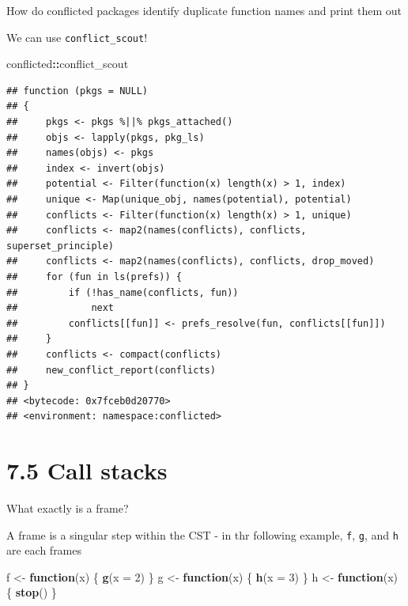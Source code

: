 \documentclass[]{book}
\newenvironment{Shaded}{\begin{snugshade}}{\end{snugshade}}
\newcommand{\ControlFlowTok}[1]{\textcolor[rgb]{0.13,0.29,0.53}{\textbf{#1}}}
\newcommand{\DataTypeTok}[1]{\textcolor[rgb]{0.13,0.29,0.53}{#1}}
\newcommand{\DecValTok}[1]{\textcolor[rgb]{0.00,0.00,0.81}{#1}}
\newcommand{\KeywordTok}[1]{\textcolor[rgb]{0.13,0.29,0.53}{\textbf{#1}}}
\newcommand{\NormalTok}[1]{#1}
\newcommand{\OperatorTok}[1]{\textcolor[rgb]{0.81,0.36,0.00}{\textbf{#1}}}
\newcommand{\StringTok}[1]{\textcolor[rgb]{0.31,0.60,0.02}{#1}}
\begin{document}
How do conflicted packages identify duplicate function names and print them out

We can use \texttt{conflict\_scout}!

\begin{Shaded}
\begin{Highlighting}[]
\NormalTok{conflicted}\OperatorTok{::}\NormalTok{conflict_scout}
\end{Highlighting}
\end{Shaded}

\begin{verbatim}
## function (pkgs = NULL) 
## {
##     pkgs <- pkgs %||% pkgs_attached()
##     objs <- lapply(pkgs, pkg_ls)
##     names(objs) <- pkgs
##     index <- invert(objs)
##     potential <- Filter(function(x) length(x) > 1, index)
##     unique <- Map(unique_obj, names(potential), potential)
##     conflicts <- Filter(function(x) length(x) > 1, unique)
##     conflicts <- map2(names(conflicts), conflicts, superset_principle)
##     conflicts <- map2(names(conflicts), conflicts, drop_moved)
##     for (fun in ls(prefs)) {
##         if (!has_name(conflicts, fun)) 
##             next
##         conflicts[[fun]] <- prefs_resolve(fun, conflicts[[fun]])
##     }
##     conflicts <- compact(conflicts)
##     new_conflict_report(conflicts)
## }
## <bytecode: 0x7fceb0d20770>
## <environment: namespace:conflicted>
\end{verbatim}

\hypertarget{call-stacks}{%
\section*{7.5 Call stacks}\label{call-stacks}}

What exactly is a frame?

A frame is a singular step within the CST - in thr following example, \texttt{f}, \texttt{g}, and \texttt{h} are each frames

\begin{Shaded}
\begin{Highlighting}[]
\NormalTok{f <-}\StringTok{ }\ControlFlowTok{function}\NormalTok{(x) \{}
  \KeywordTok{g}\NormalTok{(}\DataTypeTok{x =} \DecValTok{2}\NormalTok{)}
\NormalTok{\}}
\NormalTok{g <-}\StringTok{ }\ControlFlowTok{function}\NormalTok{(x) \{}
  \KeywordTok{h}\NormalTok{(}\DataTypeTok{x =} \DecValTok{3}\NormalTok{)}
\NormalTok{\}}
\NormalTok{h <-}\StringTok{ }\ControlFlowTok{function}\NormalTok{(x) \{}
  \KeywordTok{stop}\NormalTok{()}
\NormalTok{\}}
\end{Highlighting}
\end{Shaded}
\end{document}
